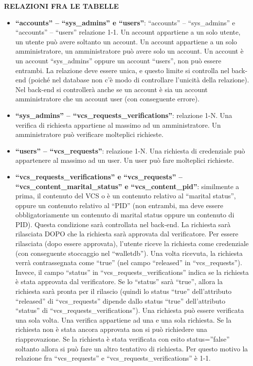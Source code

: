 \textbf{RELAZIONI FRA LE TABELLE}
\begin{itemize}
    \item \textbf{“accounts” – “sys\_admins” e “users”}: “accounts” – “sys\_admins” e “accounts” – “users” relazione 1-1. Un account appartiene a un solo utente, un utente può avere soltanto un account. Un account appartiene a un solo amministratore, un amministratore può avere solo un account. Un account è un account “sys\_admins” oppure un account “users”, non può essere entrambi. La relazione deve essere unica, e questo limite si controlla nel back-end (poiché nel database non c’è modo di controllare l’unicità della relazione). Nel back-end si controllerà anche se un account è sia un account amministratore che un account user (con conseguente errore).
    \item \textbf{“sys\_admins” – “vcs\_requests\_verifications”}: relazione 1-N. Una verifica di richiesta appartiene al massimo ad un amministratore. Un amministratore può verificare molteplici richieste.
    \item \textbf{“users” – “vcs\_requests”}: relazione 1-N. Una richiesta di credenziale può appartenere al massimo ad un user. Un user può fare molteplici richieste.
    \item \textbf{“vcs\_requests\_verifications” e “vcs\_requests” – “vcs\_content\_marital\_status” e “vcs\_content\_pid”}: similmente a prima, il contenuto del VCS o è un contenuto relativo al “marital status”, oppure un contenuto relativo al “PID” (non entrambi, ma deve essere obbligatoriamente un contenuto di marital status oppure un contenuto di PID). Questa condizione sarà controllata nel back-end. La richiesta sarà rilasciata DOPO che la richiesta sarà approvata dal verificatore. Per essere rilasciata (dopo essere approvata), l’utente riceve la richiesta come credenziale (con conseguente stoccaggio nel “walletdb”). Una volta ricevuta, la richiesta verrà contrassegnata come “true” (nel campo “released” in “vcs\_requests”). Invece, il campo “status” in “vcs\_requests\_verifications” indica se la richiesta è stata approvata dal verificatore. Se lo “status” sarà “true”, allora la richiesta sarà pronta per il rilascio (quindi lo status “true” dell’attributo “released” di “vcs\_requests” dipende dallo status “true” dell’attributo “status” di “vcs\_requests\_verifications”). Una richiesta può essere verificata una sola volta. Una verifica appartiene ad una e una sola richiesta. Se la richiesta non è stata ancora approvata non si può richiedere una riapprovazione. Se la richiesta è stata verificata con esito status=”false” soltanto allora si può fare un altro tentativo di richiesta. Per questo motivo la relazione fra “vcs\_requests” e “vcs\_requests\_verifications” è 1-1.
\end{itemize}



